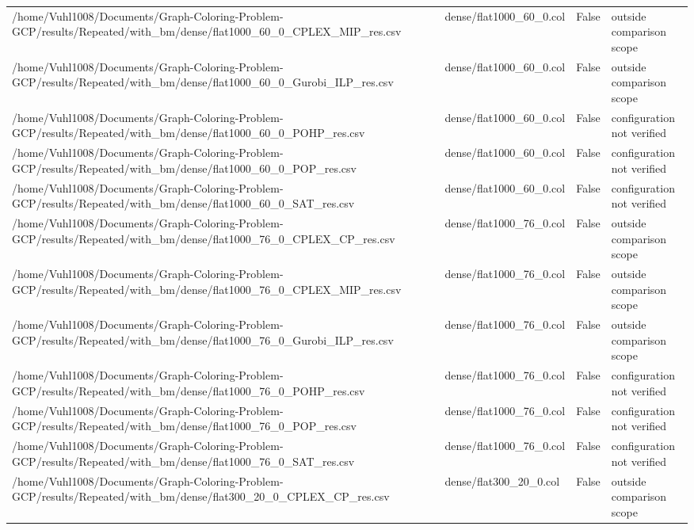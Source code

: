 \begin{table}[htbp]
\begin{tabular}{llll}
/home/Vuhl1008/Documents/Graph-Coloring-Problem-GCP/results/Repeated/with\_bm/dense/flat1000\_60\_0\_CPLEX\_MIP\_res.csv & dense/flat1000\_60\_0.col & False & outside comparison scope \\
/home/Vuhl1008/Documents/Graph-Coloring-Problem-GCP/results/Repeated/with\_bm/dense/flat1000\_60\_0\_Gurobi\_ILP\_res.csv & dense/flat1000\_60\_0.col & False & outside comparison scope \\
/home/Vuhl1008/Documents/Graph-Coloring-Problem-GCP/results/Repeated/with\_bm/dense/flat1000\_60\_0\_POHP\_res.csv & dense/flat1000\_60\_0.col & False & configuration not verified \\
/home/Vuhl1008/Documents/Graph-Coloring-Problem-GCP/results/Repeated/with\_bm/dense/flat1000\_60\_0\_POP\_res.csv & dense/flat1000\_60\_0.col & False & configuration not verified \\
/home/Vuhl1008/Documents/Graph-Coloring-Problem-GCP/results/Repeated/with\_bm/dense/flat1000\_60\_0\_SAT\_res.csv & dense/flat1000\_60\_0.col & False & configuration not verified \\
/home/Vuhl1008/Documents/Graph-Coloring-Problem-GCP/results/Repeated/with\_bm/dense/flat1000\_76\_0\_CPLEX\_CP\_res.csv & dense/flat1000\_76\_0.col & False & outside comparison scope \\
/home/Vuhl1008/Documents/Graph-Coloring-Problem-GCP/results/Repeated/with\_bm/dense/flat1000\_76\_0\_CPLEX\_MIP\_res.csv & dense/flat1000\_76\_0.col & False & outside comparison scope \\
/home/Vuhl1008/Documents/Graph-Coloring-Problem-GCP/results/Repeated/with\_bm/dense/flat1000\_76\_0\_Gurobi\_ILP\_res.csv & dense/flat1000\_76\_0.col & False & outside comparison scope \\
/home/Vuhl1008/Documents/Graph-Coloring-Problem-GCP/results/Repeated/with\_bm/dense/flat1000\_76\_0\_POHP\_res.csv & dense/flat1000\_76\_0.col & False & configuration not verified \\
/home/Vuhl1008/Documents/Graph-Coloring-Problem-GCP/results/Repeated/with\_bm/dense/flat1000\_76\_0\_POP\_res.csv & dense/flat1000\_76\_0.col & False & configuration not verified \\
/home/Vuhl1008/Documents/Graph-Coloring-Problem-GCP/results/Repeated/with\_bm/dense/flat1000\_76\_0\_SAT\_res.csv & dense/flat1000\_76\_0.col & False & configuration not verified \\
/home/Vuhl1008/Documents/Graph-Coloring-Problem-GCP/results/Repeated/with\_bm/dense/flat300\_20\_0\_CPLEX\_CP\_res.csv & dense/flat300\_20\_0.col & False & outside comparison scope \\

\end{tabular}
\end{table}
